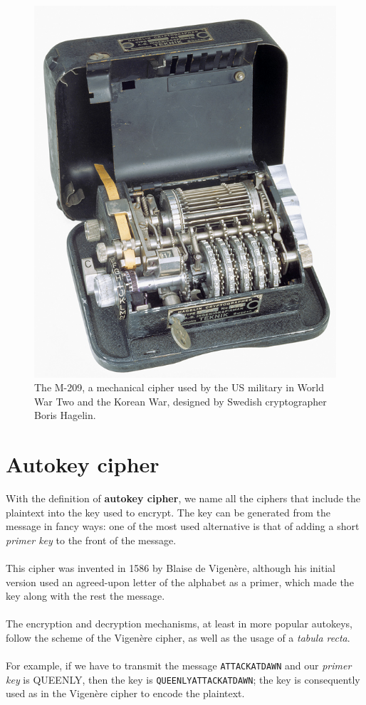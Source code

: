 \documentclass[Lau,binding=0.6cm,oneside]{sapthesis}
\begin{document}
\begin{figure}[H]
\includegraphics[scale=0.27]{m-209}
\captionsetup{justification=centering, margin=0.6cm}
\centering
\caption{The M-209, a mechanical cipher used by the US military in World War Two and the Korean War, designed by Swedish cryptographer Boris Hagelin.}
\centering
\end{figure}

\section{Autokey cipher}
With the definition of \textbf{autokey cipher}, we name all the ciphers that include the plaintext into the key used to encrypt. The key can be generated from the message in fancy ways: one of the most used alternative is that of adding a short \textit{primer key} to the front of the message.\\\\
This cipher was invented in 1586 by Blaise de Vigenère, although his initial version used an agreed-upon letter of the alphabet as a primer, which made the key along with the rest the message.\\\\
The encryption and decryption mechanisms, at least in more popular autokeys, follow the scheme of the Vigenère cipher, as well as the usage of a \textit{tabula recta}.\\\\
For example, if we have to transmit the message \colorbox{gray!12}{\small{\texttt{ATTACKATDAWN}}} and our \textit{primer key} is \textsf{QUEENLY}, then the key is \colorbox{gray!12}{\small{\texttt{QUEENLYATTACKATDAWN}}}; the key is consequently used as in the Vigenère cipher to encode the plaintext.
\end{document}

